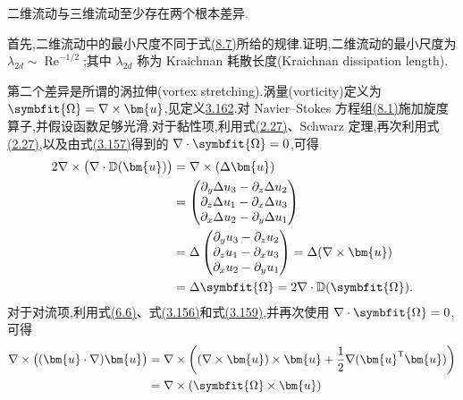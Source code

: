 \begin{note}[二维流动与三维流动的差异]
\label{note:two-three-dimensional-flow-differences}
二维流动与三维流动至少存在两个根本差异.

首先,二维流动中的最小尺度不同于式\hyperref[eq:kolmogorov-length-reynolds-scaling]{(8.7)}所给的规律.\textcite{Kraichnan1967}证明,二维流动的最小尺度为 $\lambda_{2d}\sim\operatorname{Re}^{-1/2}$;其中 $\lambda_{2d}$ 称为 Kraichnan 耗散长度(Kraichnan dissipation length).

第二个差异是所谓的涡拉伸(vortex stretching).涡量(vorticity)定义为 $\symbfit{\Omega}=\nabla\times\bm{u}$,见定义\hyperref[def:rotation-curl]{3.162}.对 Navier--Stokes 方程组\hyperref[eq:turbulent-navier-stokes]{(8.1)}施加旋度算子,并假设函数足够光滑.对于黏性项,利用式\hyperref[eq:viscous-term-laplacian]{(2.27)}、Schwarz 定理,再次利用式\hyperref[eq:viscous-term-laplacian]{(2.27)},以及由式\hyperref[eq:divergence-curl-zero]{(3.157)}得到的 $\nabla\cdot\symbfit{\Omega}=0$,可得
\[
\begin{aligned}
 2\nabla\times\bigl(\nabla\cdot\mathbb{D}(\bm{u})\bigr)
 &=\nabla\times(\Delta\bm{u})\\
 &=\begin{pmatrix}
   \partial_y\Delta u_3-\partial_z\Delta u_2\\
   \partial_z\Delta u_1-\partial_x\Delta u_3\\
   \partial_x\Delta u_2-\partial_y\Delta u_1
  \end{pmatrix}\\
 &=\Delta\begin{pmatrix}
   \partial_yu_3-\partial_zu_2\\
   \partial_zu_1-\partial_xu_3\\
   \partial_xu_2-\partial_yu_1
  \end{pmatrix}
 =\Delta(\nabla\times\bm{u})\\
 &=\Delta\symbfit{\Omega}
  =2\nabla\cdot\mathbb{D}(\symbfit{\Omega}).
\end{aligned}
\]
对于对流项,利用式\hyperref[eq:steady-ns-rotational-identity]{(6.6)}、式\hyperref[eq:curl-gradient-zero]{(3.156)}和式\hyperref[eq:curl-cross-product-divergence]{(3.159)},并再次使用 $\nabla\cdot\symbfit{\Omega}=0$,可得
\[
\begin{aligned}
 \nabla\times\bigl((\bm{u}\cdot\nabla)\bm{u}\bigr)
 &=\nabla\times\left(
      (\nabla\times\bm{u})\times\bm{u}
      +\frac12\nabla(\bm{u}^{\mathsf{T}}\bm{u})
    \right)\\
 &=\nabla\times(\symbfit{\Omega}\times\bm{u})\\

\end{aligned}\]
\end{note}
